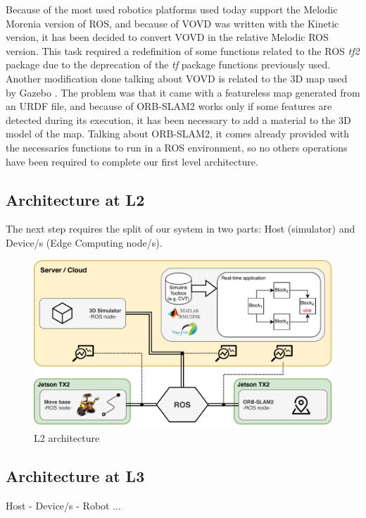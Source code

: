 Because of the most used robotics platforms used today support the Melodic Morenia \cite{rosmelodic} version of ROS, and because of VOVD was written with the Kinetic version, it has been decided to convert VOVD in the relative Melodic ROS version. This task required a redefinition of some functions related to the ROS \textit{tf2} package \cite{tfros} due to the deprecation of the \textit{tf} package functions previously used. 
Another modification done talking about VOVD is related to the 3D map used by Gazebo \cite{Gazebo}. The problem was that it came with a featureless map generated from an URDF file, and because of ORB-SLAM2 works only if some features are detected during its execution, it has been necessary to add a material to the 3D model of the map.
Talking about ORB-SLAM2, it comes already provided with the necessaries functions to run in a ROS environment, so no others operations have been required to complete our first level architecture.



\subsection{Architecture at L2} %
The next step requires the split of our system in two parts: Host (simulator) and Device/s (Edge Computing node/s).

\begin{figure}
	\centering
	\includegraphics[width=\textwidth]{images/L2_arch}
	\caption{L2 architecture}
	\label{fig:l2arch}
\end{figure}







\subsection{Architecture at L3}	%
Host - Device/s - Robot ...

